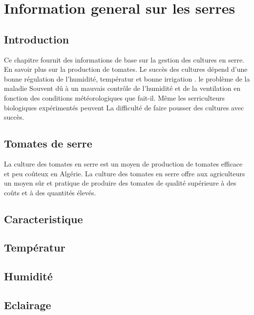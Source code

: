 \chapter{Information general sur les serres } \label{chap:Information general sur les serres}

\section*{Introduction}
Ce chapitre fournit des informations de base sur la gestion des cultures en serre.
En savoir plus sur la production de tomates. 
Le succès des cultures dépend d'une bonne régulation de l'humidité,
 températur et bonne irrigation . le problème de la maladie 
 Souvent dû à un mauvais contrôle de l'humidité et de la ventilation en fonction des conditions météorologiques 
 que fait-il. Même les serriculteurs biologiques expérimentés peuvent 
 La difficulté de faire pousser des cultures avec succès.
 \\
\section*{Tomates de serre }
La culture des tomates en serre est un moyen de production de tomates efficace et peu coûteux en Algérie. La culture des tomates en serre offre aux agriculteurs un moyen sûr et pratique de produire des tomates de qualité supérieure à des coûts et à des quantités élevés.
\section*{Caracteristique}
\section{Températur}
\section{Humidité}
\section{Eclairage}